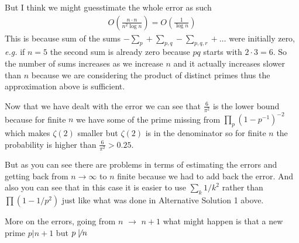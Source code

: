 \documentclass[aps,preprint,preprintnumbers,nofootinbib,showpacs,prd]{revtex4-1}
\newcommand{\eg}{{\it e.g.} }
\newcommand{\nbea}{\begin{eqnarray*}}
\newcommand{\neea}{\end{eqnarray*}}
\begin{document}
\begin{enumerate}
But I think we might guesstimate the whole error as such 
%
\nbea
O\left ( \frac{n\cdot n}{n^2 \log n} \right ) = O \left ( \frac{1}{\log n} \right )
\neea
%
This is because sum of the sums $-\sum_p + \sum_{p,q} - \sum_{p,q,r} + \dots$ were initially zero, \eg if $n = 5$ the second sum is already zero because $pq$ starts with $2\cdot3 = 6$. So the number of sums increases as we increase $n$ and it actually increases slower than $n$ because we are considering the product of distinct primes thus the approximation above is sufficient.

Now that we have dealt with the error we can see that $\frac{6}{\pi^2}$ is the lower bound because for finite $n$ we have some of the prime missing from $\prod_p (1 - p^{-1})^{-2}$ which makes $\zeta(2)$ smaller but $\zeta(2)$ is in the denominator so for finite $n$ the probability is higher than $\frac{6}{\pi^2} > 0.25$.

But as you can see there are problems in terms of estimating the errors and getting back from $n \to \infty$ to $n$ finite because we had to add back the error. And also you can see that in this case it is easier to use $\sum_k 1/k^2$ rather than $\prod (1 - 1/p^2)$ just like what was done in Alternative Solution 1 above.

%

\end{enumerate}
%







































More on the errors, going from $n$ $\to$ $n+1$ what might happen is that a new prime $p|n+1$ but $p\not\mid n$
\end{document}
